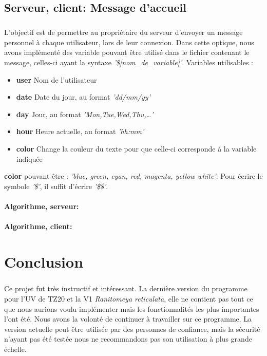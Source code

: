 \documentclass[12pt,a4paper,twoside]{article}
\begin{document}
		\subsection{Serveur, client: Message d'accueil} %
			\subparagraph*{}
				L'objectif est de permettre au propriétaire du serveur d'envoyer un message personnel à chaque utilisateur, lors de leur connexion.
				Dans cette optique, nous avons implémenté des variable pouvant être utilisé dans le fichier contenant le message, celles-ci ayant la syntaxe \textit{'\$[nom\_de\_variable]'}.
				Variables utilisables :
				\begin{itemize}
					\item{} \textbf{user} Nom de l'utilisateur
					\item{} \textbf{date} Date du jour, au format \textit{'dd/mm/yy'}
					\item{} \textbf{day} Jour, au format \textit{'Mon,Tue,Wed,Thu,\ldots'}
					\item{} \textbf{hour} Heure actuelle, au format \textit{'hh:mm'}
					\item{} \textbf{color} Change la couleur du texte pour que celle-ci corresponde à la variable indiquée
				\end{itemize}
				\textbf{color} pouvant être : \textit{'blue, green, cyan, red, magenta, yellow  white'}.
				Pour écrire le symbole \textit{'\$'}, il suffit d'écrire \textit{'\$\$'}.
			\paragraph*{Algorithme, serveur:}
				
				
			\paragraph*{Algorithme, client:}
				
				
	\section{Conclusion} %
		\subparagraph*{}
		Ce projet fut très instructif et intéressant. La dernière version du programme pour l'UV de TZ20 et la V1 \textit{Ranitomeya reticulata}, elle ne contient pas tout ce que nous aurions voulu implémenter mais les fonctionnalités les plus importantes l'ont été. Nous avons la volonté de continuer à travailler sur ce programme. La version actuelle peut être utilisée par des personnes de confiance, mais la sécurité n’ayant pas été testée nous ne recommandons pas son utilisation à plus grande échelle.
\end{document}
